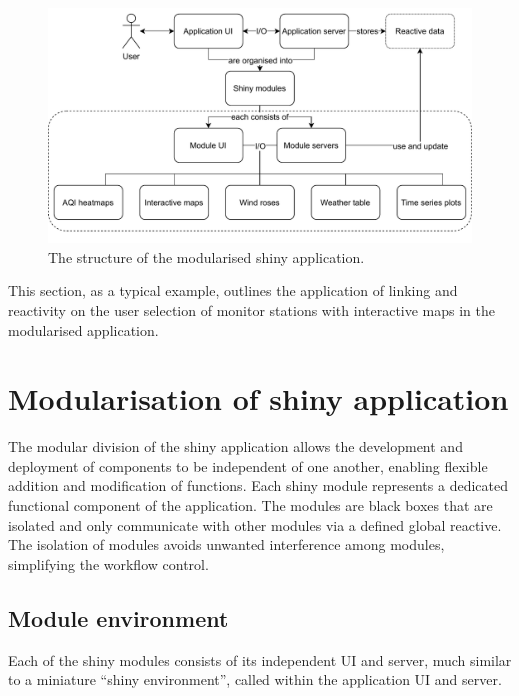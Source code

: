 \documentclass{aucklandthesis}
\begin{document}
\begin{figure}
\includegraphics[width=1\linewidth]{figures/app-structure} \caption{The structure of the modularised shiny application.}\label{fig:unnamed-chunk-7}
\end{figure}



This section, as a typical example, outlines the application of linking and reactivity on the user selection of monitor stations with interactive maps in the modularised application.

\hypertarget{modularisation-of-shiny-application}{%
\section{Modularisation of shiny application}\label{modularisation-of-shiny-application}}

The modular division of the shiny application allows the development and deployment of components to be independent of one another, enabling flexible addition and modification of functions. Each shiny module represents a dedicated functional component of the application. The modules are black boxes that are isolated and only communicate with other modules via a defined global reactive. The isolation of modules avoids unwanted interference among modules, simplifying the workflow control.

\hypertarget{module-environment}{%
\subsection{Module environment}\label{module-environment}}

Each of the shiny modules consists of its independent UI and server, much similar to a miniature ``shiny environment'', called within the application UI and server.
\end{document}
